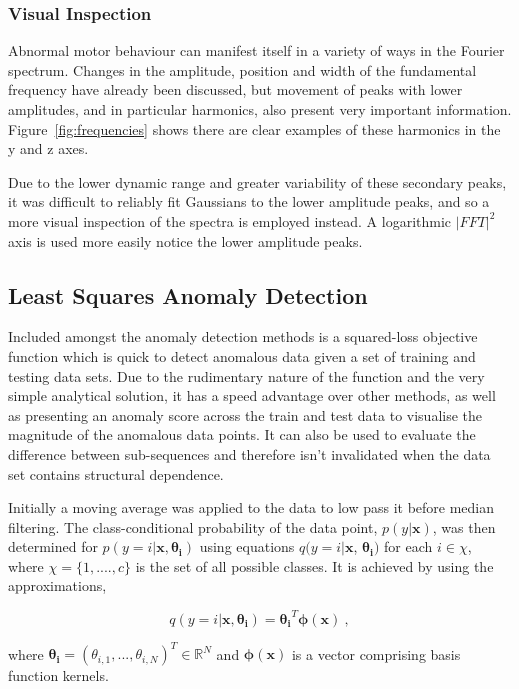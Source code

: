  
\subsubsection{Visual Inspection}
Abnormal motor behaviour can manifest itself in a variety of ways in the Fourier spectrum. Changes in the amplitude, position and width of the fundamental frequency have already been discussed, but movement of peaks with lower amplitudes, and in particular harmonics, also present very important information. Figure~\ref{fig:frequencies} shows there are clear examples of these harmonics in the y and z axes.

Due to the lower dynamic range and greater variability of these secondary peaks, it was difficult to reliably fit Gaussians to the lower amplitude peaks, and so a more visual inspection of the spectra is employed instead. A logarithmic $|FFT|^2$ axis is used more easily notice the lower amplitude peaks.

\subsection{Least Squares Anomaly Detection}
Included amongst the anomaly detection methods is a squared-loss objective function which is quick to detect anomalous data given a set of training and testing data sets. Due to the rudimentary nature of the function and the very simple analytical solution, it has a speed advantage over other methods, as well as presenting an anomaly score across the train and test data to visualise the magnitude of the anomalous data points. It can also be used to evaluate the difference between sub-sequences and therefore isn't invalidated when the data set contains structural dependence.

Initially a moving average was applied to the data to low pass it before median filtering. The class-conditional probability of the data point,  $p(y|\mathbf{x})$, was then determined for $p(y=i|\mathbf{x}, \mathbf{\theta_i})$ using equations $q(y=i|\mathbf{x}$, $\mathbf{\theta_i})$ for each $i \in \chi$, where $\chi = \{1, ...., c\}$ is the set of all possible classes.
It is achieved by using the approximations,

\begin{equation}
q(y=i|\mathbf{x},\mathbf{\theta_i}) = \mathbf{\theta_i}^T\mathbf{\phi}(\mathbf{x})~,
\end{equation}

where $\mathbf{\theta_i} = (\theta_{i,1},...,\theta_{i,N})^T \in \mathbb{R}^N$ and $\mathbf{\phi}(\mathbf{x})$ is a vector comprising basis function kernels.

